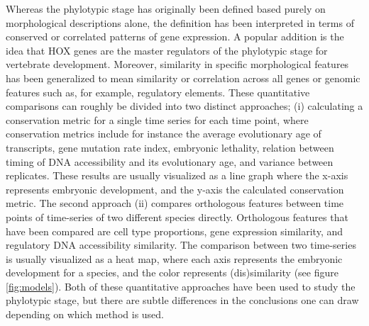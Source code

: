 Whereas the phylotypic stage has originally been defined based purely on morphological descriptions alone, the definition has been interpreted in terms of conserved or correlated patterns of gene expression. A popular addition is the idea that HOX genes are the master regulators of the phylotypic stage for vertebrate development\cite{Duboule1994}. Moreover, similarity in specific morphological features has been generalized to mean similarity or correlation across all genes or genomic features such as, for example, regulatory elements. These quantitative comparisons can roughly be divided into two distinct approaches; (i) calculating a conservation metric for a single time series for each time point, where conservation metrics include for instance the average evolutionary age of transcripts\cite{DomazetLoso2010}, gene mutation rate index\cite{Quint2012, Piasecka2013}, embryonic lethality\cite{Uchida2018}, relation between timing of DNA accessibility and its evolutionary age\cite{Uesaka2019}, and variance between replicates\cite{Liu2020, Uchida2022}. These results are usually visualized as a line graph where the x-axis represents embryonic development, and the y-axis the calculated conservation metric. The second approach (ii) compares orthologous features between time points of time-series of two different species directly. Orthologous features that have been compared are cell type proportions\cite{Mayshar2023}, gene expression similarity\cite{Irie2011, Kalinka2010, Levin2016, marletaz2018, PerezPosada2022}, and regulatory DNA accessibility similarity\cite{Hu2017, Liu2021}. The comparison between two time-series is usually visualized as a heat map, where each axis represents the embryonic development for a species, and the color represents (dis)similarity (see figure \ref{fig:models}). Both of these quantitative approaches have been used to study the phylotypic stage, but there are subtle differences in the conclusions one can draw depending on which method is used. 

